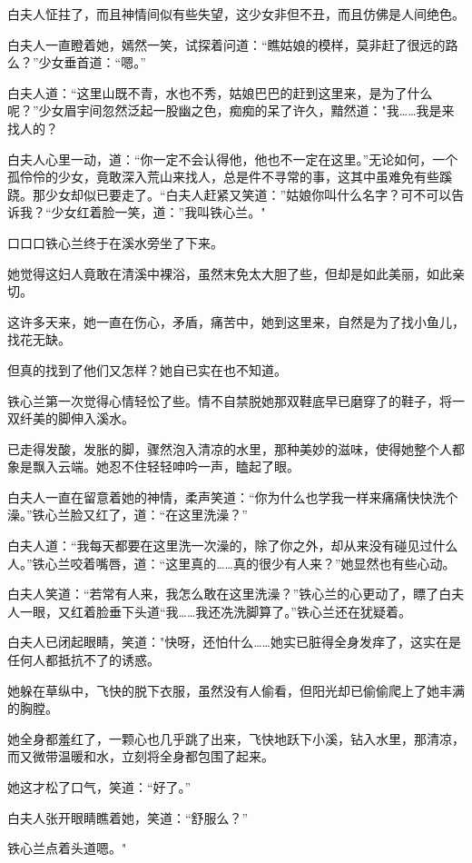 \documentclass[12pt,oneside]{book}
\begin{document}
白夫人怔拄了，而且神情间似有些失望，这少女非但不丑，而且仿佛是人间绝色。

白夫人一直瞪着她，嫣然一笑，试探着问道：``瞧姑娘的模样，莫非赶了很远的路么？''少女垂首道：``嗯。''

白夫人道：``这里山既不青，水也不秀，姑娘巴巴的赶到这里来，是为了什么呢？''少女眉宇间忽然泛起一股幽之色，痴痴的呆了许久，黯然道："我\ldots\ldots 我是来找人的？

白夫人心里一动，道：``你一定不会认得他，他也不一定在这里。''无论如何，一个孤伶伶的少女，竟敢深入荒山来找人，总是件不寻常的事，这其中虽难免有些蹊跷。那少女却似已要走了。``白夫人赶紧又笑道：''姑娘你叫什么名字？可不可以告诉我？``少女红着脸一笑，道：''我叫铁心兰。"

口口口铁心兰终于在溪水旁坐了下来。

她觉得这妇人竟敢在清溪中裸浴，虽然末免太大胆了些，但却是如此美丽，如此亲切。

这许多天来，她一直在伤心，矛盾，痛苦中，她到这里来，自然是为了找小鱼儿，找花无缺。

但真的找到了他们又怎样？她自已实在也不知道。

铁心兰第一次觉得心情轻忪了些。情不自禁脱她那双鞋底早已磨穿了的鞋子，将一双纤美的脚伸入溪水。

已走得发酸，发胀的脚，骤然泡入清凉的水里，那种美妙的滋味，使得她整个人都象是飘入云端。她忍不住轻轻呻吟一声，瞌起了眼。

白夫人一直在留意着她的神情，柔声笑道：``你为什么也学我一样来痛痛快快洗个澡。''铁心兰脸又红了，道：``在这里洗澡？''

白夫人道：``我每天都要在这里洗一次澡的，除了你之外，却从来没有碰见过什么人。''铁心兰咬着嘴唇，道：``这里真的\ldots\ldots 真的很少有人来？''她显然也有些心动。

白夫人笑道：``若常有人来，我怎么敢在这里洗澡？''铁心兰的心更动了，瞟了白夫人一眼，又红着脸垂下头道``我\ldots\ldots 我还冼洗脚算了。''铁心兰还在犹疑着。

白夫人已闭起眼睛，笑道："快呀，还怕什么\ldots\ldots 她实已脏得全身发痒了，这实在是任何人都抵抗不了的诱惑。

她躲在草纵中，飞快的脱下衣服，虽然没有人偷看，但阳光却已偷偷爬上了她丰满的胸膛。

她全身都羞红了，一颗心也几乎跳了出来，飞快地跃下小溪，钻入水里，那清凉，而又微带温暖和水，立刻将全身都包围了起来。

她这才松了口气，笑道：``好了。''

白夫人张开眼睛瞧着她，笑道：``舒服么？''

铁心兰点着头道嗯。"
\end{document}
